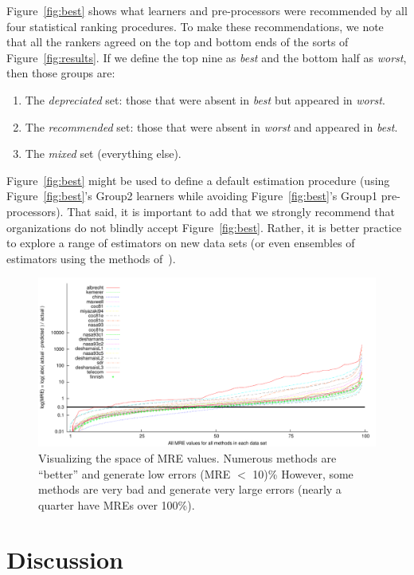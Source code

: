 \documentclass{sig-alternate}
\newcommand{\bi}{\begin{itemize}}
\newcommand{\ei}{\end{itemize}}
\newcommand{\be}{\begin{enumerate}}
\newcommand{\ee}{\end{enumerate}}
\newcommand{\fig}[1]{Figure~\ref{fig:#1}}
\begin{document}
\fig{best} shows what learners and pre-processors were recommended by all
four statistical ranking procedures. To make these recommendations,
we note that all the rankers agreed on the top and bottom ends of the sorts
of \fig{results}. If we define the top nine as {\em best} and the bottom half
as {\em worst}, then those groups are:
\be
\item The {\em depreciated} set: 
those that were absent in {\em best} but appeared in {\em worst}.
\item The {\em recommended} set:
those that were absent  in {\em worst} and appeared in {\em best}.
\item The {\em mixed} set (everything else).
\ee
\fig{best} might be used to define a default
estimation procedure (using \fig{best}'s Group2 learners while
avoiding \fig{best}'s  Group1 pre-processors).
That said, it is important to add that we 
strongly recommend that organizations
do not blindly accept \fig{best}. Rather, it is better practice to
explore a range of estimators on new data sets (or even ensembles
of estimators using the methods of~\cite{me11a}).


\begin{figure}
\begin{center}
\includegraphics[width=6in]{mres.pdf}
\end{center}
\caption{Visualizing the space of MRE values.
Numerous methods are ``better'' and generate low errors
(MRE $<$ 10)\%
However, some methods are very bad and generate very large
errors (nearly a quarter have MREs over 100\%). }\label{fig:mres}
\end{figure}


\section{Discussion}

\end{document}
